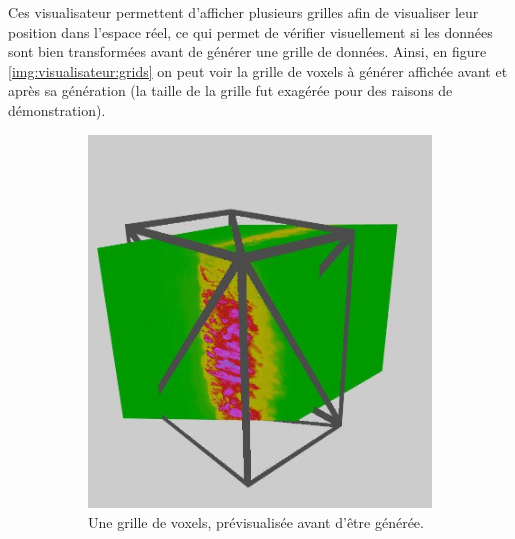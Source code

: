 {{{            Ces visualisateur permettent d'afficher plusieurs grilles afin de visualiser leur position dans l'espace réel, ce qui permet de vérifier visuellement si les données sont bien transformées avant de générer une grille de données. Ainsi, en figure \ref{img:visualisateur:grids} on peut voir la grille de voxels à générer affichée avant et après sa génération (la taille de la grille fut exagérée pour des raisons de démonstration).

            \begin{figure}[h]
                \centering
                \begin{subfigure}{.45\linewidth}
                    \centering
                    \includegraphics[width=.9\linewidth]{img/visu_screens/grid_empty.jpg}
                    \captionsetup{width=.8\linewidth}
                    \caption{Une grille de voxels, prévisualisée avant d'être générée.}
                    \label{img:visualisateur:grids:empty}
                \end{subfigure}
                \begin{subfigure}{.45\linewidth}
                    \centering

\end{subfigure}
\end{figure}}}}
